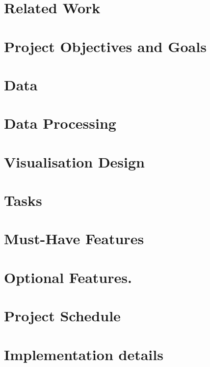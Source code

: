 \documentclass[a4paper]{article}
\begin{document}
\section{Related Work}
\section{Project Objectives and Goals}
\section{Data}
\section{Data Processing}
\section{Visualisation Design}
\section{Tasks}
\section{Must-Have Features}
\section{Optional Features.}
\section{Project Schedule}
\section{Implementation details}
\end{document}

